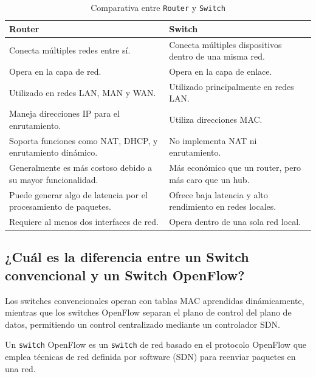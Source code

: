 \begin{table}[h]
\centering
\label{tab:router-vs-switch}
\begin{tabular}{>{\raggedright\arraybackslash}p{6.5cm}>{\raggedright\arraybackslash}p{6.5cm}}
\toprule
\textbf{Router} & \textbf{Switch} \\
\midrule
Conecta múltiples redes entre sí. & Conecta múltiples dispositivos dentro de una misma red. \\
\midrule
Opera en la capa de red. & Opera en la capa de enlace. \\
\midrule
Utilizado en redes LAN, MAN y WAN. & Utilizado principalmente en redes LAN. \\
\midrule
Maneja direcciones IP para el enrutamiento. & Utiliza direcciones MAC. \\
\midrule
Soporta funciones como NAT, DHCP, y enrutamiento dinámico. & No implementa NAT ni enrutamiento. \\
\midrule
Generalmente es más costoso debido a su mayor funcionalidad. & Más económico que un router, pero más caro que un hub. \\
\midrule
Puede generar algo de latencia por el procesamiento de paquetes. & Ofrece baja latencia y alto rendimiento en redes locales. \\
\midrule
Requiere al menos dos interfaces de red. & Opera dentro de una sola red local. \\
\bottomrule
\end{tabular}
\caption{Comparativa entre \texttt{Router} y \texttt{Switch}}
\end{table}



\subsection{¿Cuál es la diferencia entre un Switch convencional y un Switch OpenFlow?}

\vspace{0.15cm}

Los switches convencionales operan con tablas MAC aprendidas dinámicamente, mientras que los switches OpenFlow separan el plano de control del plano de datos, permitiendo un control centralizado mediante un controlador SDN.

\vspace{0.25cm}

Un \texttt{switch} OpenFlow es un \texttt{switch} de red basado en el protocolo OpenFlow que emplea técnicas de red definida por software (SDN) para reenviar paquetes en una red.

